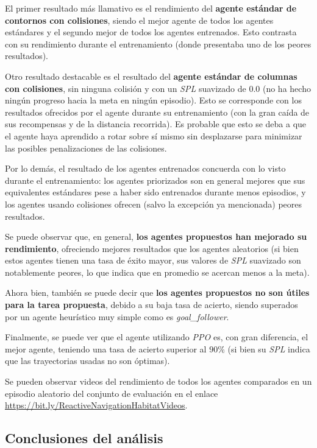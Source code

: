 \newpage

El primer resultado más llamativo es el rendimiento del \textbf{agente estándar de contornos con colisiones}, siendo el mejor agente de todos los agentes estándares y el segundo mejor de todos los agentes entrenados. Esto contrasta con su rendimiento durante el entrenamiento (donde presentaba uno de los peores resultados).

Otro resultado destacable es el resultado del \textbf{agente estándar de columnas con colisiones}, sin ninguna colisión y con un \textit{SPL} suavizado de 0.0 (no ha hecho ningún progreso hacia la meta en ningún episodio). Esto se corresponde con los resultados ofrecidos por el agente durante su entrenamiento (con la gran caída de sus recompensas y de la distancia recorrida). Es probable que esto se deba a que el agente haya aprendido a rotar sobre sí mismo sin desplazarse para minimizar las posibles penalizaciones de las colisiones.

Por lo demás, el resultado de los agentes entrenados concuerda con lo visto durante el entrenamiento: los agentes priorizados son en general mejores que sus equivalentes estándares pese a haber sido entrenados durante menos episodios, y los agentes usando colisiones ofrecen (salvo la excepción ya mencionada) peores resultados.

Se puede observar que, en general, \textbf{los agentes propuestos han mejorado su rendimiento}, ofreciendo mejores resultados que los agentes aleatorios (si bien estos agentes tienen una tasa de éxito mayor, sus valores de \textit{SPL} suavizado son notablemente peores, lo que indica que en promedio se acercan menos a la meta).

Ahora bien, también se puede decir que \textbf{los agentes propuestos no son útiles para la tarea propuesta}, debido a su baja tasa de acierto, siendo superados por un agente heurístico muy simple como es \textit{goal{\_}follower}.

Finalmente, se puede ver que el agente utilizando \textit{PPO} es, con gran diferencia, el mejor agente, teniendo una tasa de acierto superior al $90\%$ (si bien su \textit{SPL} indica que las trayectorias usadas no son óptimas).

Se pueden observar videos del rendimiento de todos los agentes comparados en un episodio aleatorio del conjunto de evaluación en el enlace \url{https://bit.ly/ReactiveNavigationHabitatVideos}.

\subsection{Conclusiones del análisis}

